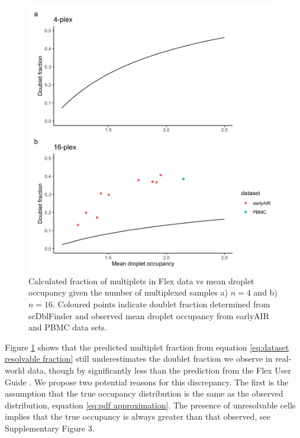 \documentclass[unnumsec,webpdf,modern,large]{oup-authoring-template}
\begin{document}
	\begin{figure}
		\begin{center}
			\includegraphics[scale=0.1]{figures/observable_fraction.png}	
			\caption{Calculated fraction of multiplets in Flex data vs mean droplet occupancy given the number of multiplexed samples a) $n = 4$ and b) $n = 16$.
			Coloured points indicate doublet fraction determined from scDblFinder and observed mean droplet occupancy from earlyAIR and PBMC data sets.
			}		
			\label{fig: resolvable fraction observed}
		\end{center}
	\end{figure}
	Figure \ref{fig: resolvable fraction observed} shows that the predicted multiplet fraction from equation \eqref{eq:dataset resolvable fraction} still underestimates the doublet fraction we observe in real-world data, though by significantly less than the prediction from the Flex User Guide 
	\citep{10X_flex_protocol}. 
	We propose two potential reasons for this discrepancy. 
	The first is the assumption that the true occupancy distribution is the same as the observed distribution, equation \ref{eq:pdf approximation}.
	The presence of unresolvable cells implies that the true occupancy is always greater than that observed, see Supplementary Figure 3.
\end{document}
